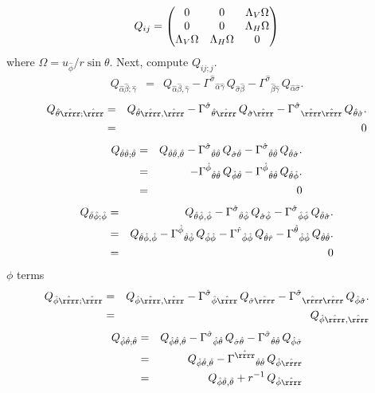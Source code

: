 \documentclass[\mydriver,12pt,twoside,notitlepage,a4paper]{article}
\begin{document}
\begin{equation}
Q_{ij}=
\begin{pmatrix}
0 & 0 & \Lambda_V\Omega \cr
0 & 0 & \Lambda_H\Omega \cr
\Lambda_V\Omega & \Lambda_H\Omega & 0
\end{pmatrix}
\end{equation}
where $\Omega=u_{\hat\phi}/r\sin\theta$.
Next, compute $Q_{ij;j}$.
\begin{eqnarray}
Q_{\hat\alpha\hat\beta;\hat\gamma}
&=&Q_{\hat\alpha\hat\beta,\hat\gamma}
-{\Gamma^{\hat\sigma}}_{\hat\alpha\hat\gamma}\,Q_{\hat\sigma\hat\beta}
-{\Gamma^{\hat\sigma}}_{\hat\beta\hat\gamma}\,Q_{\hat\alpha\hat\sigma}.
\end{eqnarray}
\begin{eqnarray}
Q_{\hat\theta\hat\rrrr;\hat\rrrr}
&=&Q_{\hat\theta\hat\rrrr,\hat\rrrr}
-{\Gamma^{\hat\sigma}}_{\hat\theta\hat\rrrr}\,Q_{\hat\sigma\hat\rrrr}
-{\Gamma^{\hat\sigma}}_{\hat\rrrr\hat\rrrr}\,Q_{\hat\theta\hat\sigma}.
\cr
&=&0
\end{eqnarray}
\begin{eqnarray}
Q_{\hat\theta\hat\theta;\hat\theta}
&=&Q_{\hat\theta\hat\theta,\hat\theta}
-{\Gamma^{\hat\sigma}}_{\hat\theta\hat\theta}\,Q_{\hat\sigma\hat\theta}
-{\Gamma^{\hat\sigma}}_{\hat\theta\hat\theta}\,Q_{\hat\theta\hat\sigma}.
\cr
&=&
-{\Gamma^{\hat\phi}}_{\hat\theta\hat\theta}\,Q_{\hat\phi\hat\theta}
-{\Gamma^{\hat\phi}}_{\hat\theta\hat\theta}\,Q_{\hat\theta\hat\phi}.
\cr
&=&0
\end{eqnarray}
\begin{eqnarray}
Q_{\hat\theta\hat\phi;\hat\phi}
&=&Q_{\hat\theta\hat\phi,\hat\phi}
-{\Gamma^{\hat\sigma}}_{\hat\theta\hat\phi}\,Q_{\hat\sigma\hat\phi}
-{\Gamma^{\hat\sigma}}_{\hat\phi\hat\phi}\,Q_{\hat\theta\hat\sigma}.
\cr
&=&Q_{\hat\theta\hat\phi,\hat\phi}
-{\Gamma^{\hat\phi}}_{\hat\theta\hat\phi}\,Q_{\hat\phi\hat\phi}
-{\Gamma^{\hat r}}_{\hat\phi\hat\phi}\,Q_{\hat\theta\hat r}
-{\Gamma^{\hat\theta}}_{\hat\phi\hat\phi}\,Q_{\hat\theta\hat\theta}.
\cr
&=&0
\end{eqnarray}
$\phi$ terms
\begin{eqnarray}
Q_{\hat\phi\hat\rrrr;\hat\rrrr}
&=&Q_{\hat\phi\hat\rrrr,\hat\rrrr}
-{\Gamma^{\hat\sigma}}_{\hat\phi\hat\rrrr}\,Q_{\hat\sigma\hat\rrrr}
-{\Gamma^{\hat\sigma}}_{\hat\rrrr\hat\rrrr}\,Q_{\hat\phi\hat\sigma}.
\cr
&=&Q_{\hat\phi\hat\rrrr,\hat\rrrr}
\end{eqnarray}
\begin{eqnarray}
Q_{\hat\phi\hat\theta;\hat\theta}
&=&Q_{\hat\phi\hat\theta,\hat\theta}
-{\Gamma^{\hat\sigma}}_{\hat\phi\hat\theta}\,Q_{\hat\sigma\hat\theta}
-{\Gamma^{\hat\sigma}}_{\hat\theta\hat\theta}\,Q_{\hat\phi\hat\sigma}
\cr
&=&Q_{\hat\phi\hat\theta,\hat\theta}
-{\Gamma^{\hat\rrrr}}_{\hat\theta\hat\theta}\,Q_{\hat\phi\hat\rrrr}
\cr
&=&Q_{\hat\phi\hat\theta,\hat\theta}
+r^{-1}\,Q_{\hat\phi\hat\rrrr}
\end{eqnarray}
\end{document}
